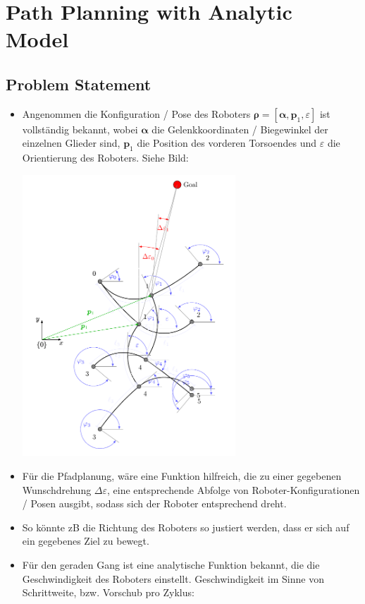\documentclass[10pt,a4paper]{article}
\begin{document}
\section{Path Planning with Analytic Model}

\subsection{Problem Statement}

\begin{itemize}

\item Angenommen die Konfiguration / Pose des Roboters $\bm{\rho} = [\bm{\alpha}, \bm{p}_1, \varepsilon]$ ist vollständig bekannt, wobei $\bm{\alpha}$ die Gelenkkoordinaten / Biegewinkel der einzelnen Glieder sind, $\bm{p}_1$ die Position des vorderen Torsoendes und $\varepsilon$ die Orientierung des Roboters.
Siehe Bild:

\includegraphics[width=8cm]{model.pdf}


\item Für die Pfadplanung, wäre eine Funktion hilfreich, die zu einer gegebenen Wunschdrehung $\Delta \varepsilon$, eine entsprechende Abfolge von Roboter-Konfigurationen / Posen ausgibt, sodass sich der Roboter entsprechend dreht.

\item So könnte zB die Richtung des Roboters so justiert werden, dass er sich auf ein gegebenes Ziel zu bewegt.


\item Für den geraden Gang ist eine analytische Funktion bekannt, die die Geschwindigkeit des Roboters einstellt. Geschwindigkeit im Sinne von Schrittweite, bzw. Vorschub pro Zyklus:


\end{itemize}
\end{document}
